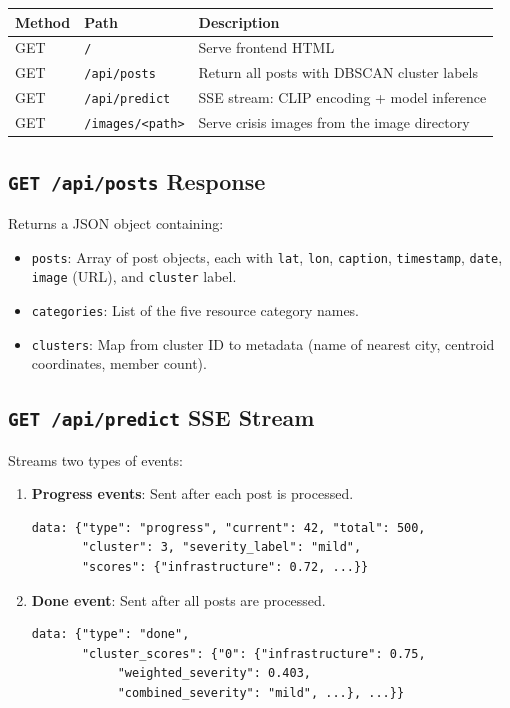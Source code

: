 \documentclass[11pt,a4paper]{article}
\begin{document}
\begin{table}[H]
\centering
\begin{tabular}{lll}
\toprule
\textbf{Method} & \textbf{Path} & \textbf{Description} \\
\midrule
GET & \texttt{/} & Serve frontend HTML \\
GET & \texttt{/api/posts} & Return all posts with DBSCAN cluster labels \\
GET & \texttt{/api/predict} & SSE stream: CLIP encoding + model inference \\
GET & \texttt{/images/<path>} & Serve crisis images from the image directory \\
\bottomrule
\end{tabular}
\end{table}

\subsection{\texttt{GET /api/posts} Response}

Returns a JSON object containing:
\begin{itemize}
    \item \texttt{posts}: Array of post objects, each with \texttt{lat}, \texttt{lon}, \texttt{caption}, \texttt{timestamp}, \texttt{date}, \texttt{image} (URL), and \texttt{cluster} label.
    \item \texttt{categories}: List of the five resource category names.
    \item \texttt{clusters}: Map from cluster ID to metadata (name of nearest city, centroid coordinates, member count).
\end{itemize}

\subsection{\texttt{GET /api/predict} SSE Stream}

Streams two types of events:

\begin{enumerate}
    \item \textbf{Progress events}: Sent after each post is processed.
\begin{lstlisting}
data: {"type": "progress", "current": 42, "total": 500,
       "cluster": 3, "severity_label": "mild",
       "scores": {"infrastructure": 0.72, ...}}
\end{lstlisting}

    \item \textbf{Done event}: Sent after all posts are processed.
\begin{lstlisting}
data: {"type": "done",
       "cluster_scores": {"0": {"infrastructure": 0.75,
            "weighted_severity": 0.403,
            "combined_severity": "mild", ...}, ...}}
\end{lstlisting}
\end{enumerate}
\end{document}
